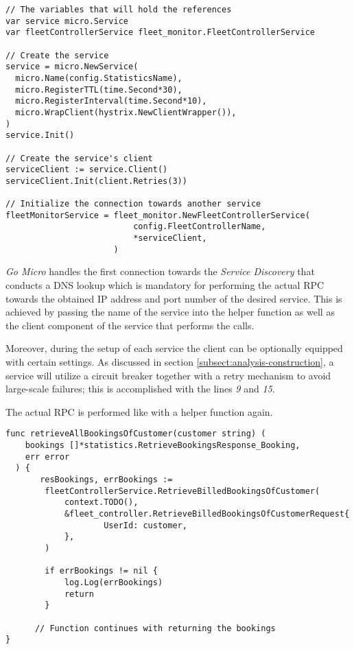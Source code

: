 \documentclass[12pt,a4paper,twoside]{report}
\begin{document}
\begin{lstlisting}[title=services/statistics/main.go]
// The variables that will hold the references
var service micro.Service
var fleetControllerService fleet_monitor.FleetControllerService

// Create the service
service = micro.NewService(
  micro.Name(config.StatisticsName),
  micro.RegisterTTL(time.Second*30),
  micro.RegisterInterval(time.Second*10),
  micro.WrapClient(hystrix.NewClientWrapper()),
)
service.Init()

// Create the service's client
serviceClient := service.Client()
serviceClient.Init(client.Retries(3))

// Initialize the connection towards another service
fleetMonitorService = fleet_monitor.NewFleetControllerService(
                          config.FleetControllerName,
                          *serviceClient,
                      )
\end{lstlisting}

\textit{Go Micro} handles the first connection towards the
\textit{Service Discovery} that conducts a DNS lookup which is mandatory
for performing the actual RPC towards the obtained IP address and port number
of the desired service.
This is achieved by passing the name of the service into the helper function
as well as the client component of the service that performs the calls.

Moreover, during the setup of each service the client can be optionally equipped
with certain settings. As discussed in section \ref{subsect:analysis-construction},
a service will utilize a circuit breaker together with a retry mechanism to
avoid large-scale failures; this is accomplished with
the lines \textit{9} and \textit{15}.

The actual RPC is performed like with a helper function again.

\begin{lstlisting}[title=services/statistics/bookings.go]
func retrieveAllBookingsOfCustomer(customer string) (
    bookings []*statistics.RetrieveBookingsResponse_Booking,
    err error
  ) {
	   resBookings, errBookings :=
        fleetControllerService.RetrieveBilledBookingsOfCustomer(
            context.TODO(),
            &fleet_controller.RetrieveBilledBookingsOfCustomerRequest{
    		        UserId: customer,
    	    },
        )

    	if errBookings != nil {
    		log.Log(errBookings)
    		return
    	}

      // Function continues with returning the bookings
}
\end{lstlisting}
\end{document}
